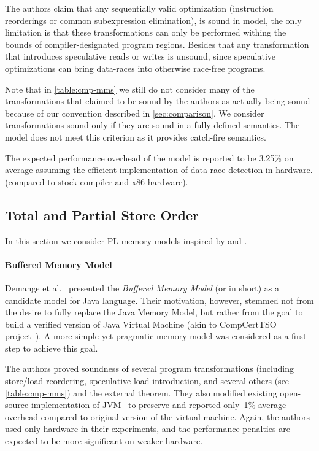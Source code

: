 The authors claim that any sequentially valid optimization 
(\eg instruction reorderings or common subexpression elimination),
is sound in \DRFx model, the only limitation is that
these transformations can only be performed
withing the bounds of compiler-designated program regions.
Besides that any transformation that introduces 
speculative reads or writes is unsound,
since speculative optimizations can bring
data-races into otherwise race-free programs.

Note that in \cref{table:cmp-mms} we still do not consider 
many of the transformations that claimed to be sound by the authors
as actually being sound because of our convention described in \cref{sec:comparison}.
We consider transformations sound only if they are 
sound in a fully-defined semantics. 
The \DRFx model does not meet this criterion as 
it provides catch-fire semantics.

The expected performance overhead of the model 
is reported to be 3.25\% on average
assuming the efficient implementation 
of data-race detection in hardware. 
(compared to stock compiler and x86 hardware). 

\subsection{Total and Partial Store Order}

In this section we consider PL memory models 
inspired by \TSO and \PSO.  

\paragraph{Buffered Memory Model}

Demange et al.~\cite{Demange-al:POPL13} presented 
the \emph{Buffered Memory Model} (or \BMM in short)
as a candidate model for Java language.
Their motivation, however, stemmed not from the desire 
to fully replace the Java Memory Model, but rather 
from the goal to build a verified version of 
Java Virtual Machine (akin to CompCertTSO project~\cite{Sevcik-al:JACM13}).
A more simple yet pragmatic memory \TSO model 
was considered as a first step to achieve this goal. 

The authors proved soundness of several program transformations
(including store/load reordering, speculative load introduction,
and several others (see \cref{table:cmp-mms})
and the external \DRF theorem. 
They also modified existing open-source implementation of 
JVM~\cite{Pizlo-al:ECCS10} to preserve \BMM and 
reported only~1\% average overhead 
compared to original version of the virtual machine. 
Again, the authors used only \Intel hardware in their 
experiments, and the performance penalties 
are expected to be more significant on weaker hardware.   

